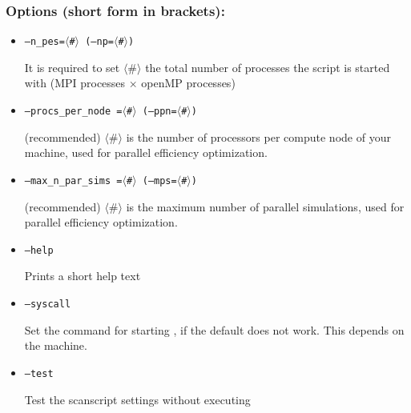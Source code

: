\documentclass[12pt]{article}
\begin{document}
\subsubsection{Options (short form in brackets):}\label{sec:scanoptions}
\begin{itemize}

\item \texttt{--n\_pes=$\langle$\#$\rangle$ (--np=$\langle$\#$\rangle$)}

It is required to set $\langle$\#$\rangle$ the total number of processes
the script is started with (MPI processes $\times$ openMP processes)

\item \texttt{--procs\_per\_node =$\langle$\#$\rangle$ (--ppn=$\langle$\#$\rangle$)}

(recommended) $\langle$\#$\rangle$ is the number of processors per
compute node of your machine, used for parallel efficiency optimization.

\item \texttt{--max\_n\_par\_sims =$\langle$\#$\rangle$ (--mps=$\langle$\#$\rangle$)}

(recommended) $\langle$\#$\rangle$ is the maximum number of parallel
simulations, used for parallel efficiency optimization.

\item \texttt{--help}

Prints a short help text

%
%
%

\item \texttt{--syscall}

Set the command for starting \gene, if the default does not work. This depends on the machine.

\item \texttt{--test }

Test the scanscript settings without executing \gene


\end{itemize}
\end{document}
